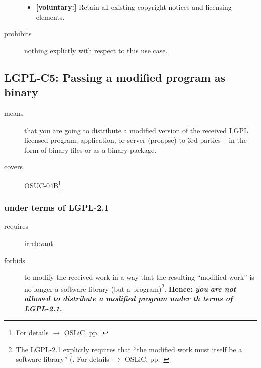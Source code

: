 \begin{description}
\begin{itemize}
  \item \textbf{[voluntary:]} Retain all existing copyright notices and
  licensing elements. 
  
 \end{itemize}
 
\item[prohibits] nothing explictly with respect to this use case.

\end{description}

\subsection{LGPL-C5: Passing a modified program as binary}
\label{OSUC-04B-LGPL} 

\begin{description}
\item[means] that you are going to distribute a modified version of the received
LGPL licensed pro\-gram, application, or server (proapse) to 3rd parties -- in
the form of binary files or as a binary package.
\item[covers] OSUC-04B\footnote{For details $\rightarrow$ OSLiC, pp.\
\pageref{OSUC-04B-DEF}}
\end{description}

\subsubsection{under terms of LGPL-2.1}

\begin{description}
  \item[requires] irrelevant
  \item[forbids] to modify the received work in a way that the resulting
  \enquote{modified work} is no longer a software library (but a
  program)\footnote{The LGPL-2.1 explictly requires that \enquote{the modified
  work must itself be a software library} (\cite[cf.][\nopage wp.\
  §2a]{Lgpl21OsiLicense1999a}. For details $\rightarrow$ OSLiC, pp.\
  \pageref{para:libislib}}. \textbf{Hence: \emph{you are not allowed to
  distribute a modified program under th terms of LGPL-2.1.}}
\end{description}

